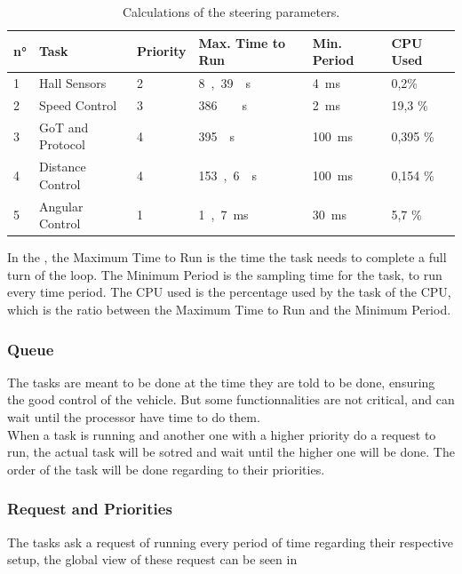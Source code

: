 \begin{table} [H]
	\begin{tabular}{|l|l|l|l|l|l|}
								
\hline
\textbf{n°}  & \textbf{Task}   	 & \textbf{Priority}	& \textbf{Max. Time to Run} 	& \textbf{Min. Period} & \textbf{CPU Used}\\
\hline
1			 &	Hall Sensors	 & 2				&	\si{8,39 \mu s}			    &	\si{4 ms}			  & 0,2\%	  \\
\hline
2			 &	Speed Control	 & 3				&	\si{386\ \mu s}				&	\si{2 ms}			  &	19,3 \%   \\
\hline
3			 &	GoT and Protocol & 4				&	\si{395 \mu s}			    &	\si{100 ms}			  &	0,395 \%  \\
\hline
4			 &	Distance Control & 4				&	\si{153,6 \mu s} 			&	\si{100 ms} 	  	  &	0,154 \%  \\
\hline
5			 &	Angular Control	 & 1				&	\si{1,7  ms}			    &	\si{30 ms}			  &	5,7 \%    \\
\hline		
	\end{tabular}
	\caption{Calculations of the steering parameters.}	
	\label{scheduleParameters}						
\end{table}	

In the , the Maximum Time to Run is the time the task needs to complete a full turn of the loop. The Minimum Period is the sampling time for the task, to run every time period. The CPU used is the percentage used by the task of the CPU, which is the ratio between the Maximum Time to Run and the Minimum Period.

\subsubsection{Queue}
The tasks are meant to be done at the time they are told to be done, ensuring the good control of the vehicle. But some functionnalities are not critical, and can wait until the processor have time to do them.\\
When a task is running and another one with a higher priority do a request to run, the actual task will be sotred and wait until the higher one will be done. The order of the task will be done regarding to their priorities.


\subsubsection{Request and Priorities}
The tasks ask a request of running every period of time regarding their respective setup, the global view of these request can be seen in 

